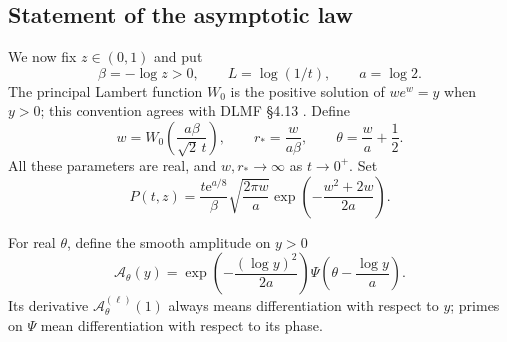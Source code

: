 \documentclass[11pt,oneside]{article}
\numberwithin{equation}{section}
\theoremstyle{definition}
\theoremstyle{remark}
\newcommand{\e}{\mathrm e}
\begin{document}
\subsection{Statement of the asymptotic law}
We now fix \(z\in(0,1)\) and put
\begin{equation}
 \beta=-\log z>0,\qquad L=\log(1/t),\qquad a=\log2.
 \label{eq:parameters}
\end{equation}
The principal Lambert function \(W_0\) is the positive solution of
\(we^w=y\) when \(y>0\); this convention agrees with DLMF
\S4.13 \cite{dlmf}. Define
\begin{equation}
 w=W_0\left(\frac{a\beta}{\sqrt2\,t}\right),\qquad
 r_* =\frac{w}{a\beta},\qquad
 \theta=\frac wa+\frac12.
 \label{eq:saddleparams}
\end{equation}
All these parameters are real, and \(w,r_*\to\infty\) as \(t\to0^+\).
Set
\begin{equation}
 P(t,z)=\frac{t\e^{a/8}}{\beta}
         \sqrt{\frac{2\pi w}{a}}
         \exp\left(-\frac{w^2+2w}{2a}\right).
 \label{eq:prefactor}
\end{equation}

For real \(\theta\), define the smooth amplitude on \(y>0\)
\begin{equation}
 \mathcal A_\theta(y)=
      \exp\left(-\frac{(\log y)^2}{2a}\right)
      \Psi\left(\theta-\frac{\log y}{a}\right).
 \label{eq:Atheta}
\end{equation}
Its derivative \(\mathcal A_\theta^{(\ell)}(1)\) always means differentiation
with respect to \(y\); primes on \(\Psi\) mean differentiation with respect
to its phase.
\end{document}
